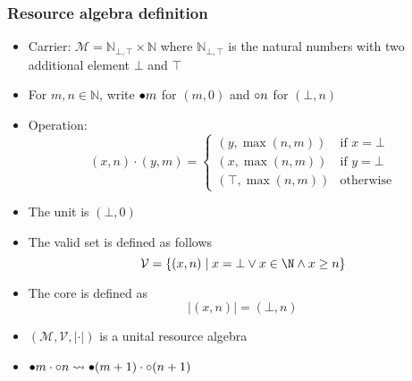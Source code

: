 \subsubsection{Resource algebra definition}
\begin{itemize}
	\item Carrier: $\mathcal M = \mathbb N_{\bot, \top} \times \mathbb N$ where $\mathbb N_{\bot, \top}$ is the natural numbers with two additional element $\bot$ and $\top$ 
  \item For $m,n \in \mathbb N$, write ${\bullet} m$ for $(m,0)$ and ${\circ} n$ for $(\bot, n)$
  \item Operation:
  \[
    (x,n) \cdot (y, m) = 
    \begin{cases} 
      (y, \max(n,m))    & \text{if } x = \bot \\ 
      (x, \max(n,m))    & \text{if } y = \bot \\ 
      (\top, \max(n,m)) & \text{otherwise}
    \end{cases}
  \]
  \item The unit is $(\bot, 0)$
  \item The valid set is defined as follows
  \[
    \mathcal V = \{(x,n) \mid x = \bot \lor x \in \N \land x \geq n\}
  \]
  \item The core is defined as
  \[
    |(x,n)| = (\bot, n)
  \]
  \item $(\mathcal M, \mathcal V, |\cdot |)$ is a unital resource algebra
  \item ${\bullet} m \cdot {\ensuremath\circ} n \leadsto {\ensuremath\bullet} (m+1) \cdot {\ensuremath\circ} (n+1)$
\end{itemize}

